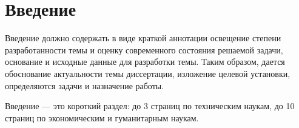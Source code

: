 \chapter*{Введение}

Введение должно содержать в виде краткой аннотации освещение степени
разработанности темы и оценку современного состояния решаемой задачи,
основание и исходные данные для разработки темы.
Таким образом, дается обоснование актуальности темы диссертации,
изложение целевой установки, определяются задачи и назначение работы.

Введение --- это короткий раздел: до 3 страниц по техническим наукам,
до 10 страниц по экономическим и гуманитарным наукам.
